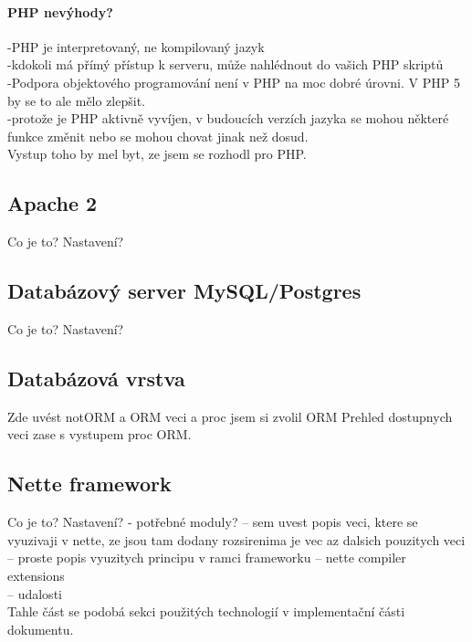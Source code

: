 \documentclass[11pt,oneside]{fithesis}
\begin{document}
       \paragraph{PHP nevýhody?}
       -PHP je interpretovaný, ne kompilovaný jazyk\\
-kdokoli má přímý přístup k serveru, může nahlédnout do vašich PHP skriptů\\
-Podpora objektového programování není v PHP na moc dobré úrovni. V PHP 5 by se to ale mělo zlepšit.\\
-protože je PHP aktivně vyvíjen, v budoucích verzích jazyka se mohou některé funkce změnit nebo se mohou chovat jinak než dosud. \\

                Vystup toho by mel byt, ze jsem se rozhodl pro PHP.

                \subsection{Apache 2}
                Co je to?
                Nastavení?

                \subsection{Databázový server MySQL/Postgres}
                Co je to?
                Nastavení?

                \subsection{Databázová vrstva}
                Zde uvést notORM a ORM veci a proc jsem si zvolil ORM
                Prehled dostupnych veci zase s vystupem proc ORM.

                \subsection{Nette framework}
                Co je to?
                Nastavení? - potřebné moduly?
                -- sem uvest popis veci, ktere se vyuzivaji v nette, ze jsou tam dodany rozsirenima je vec az dalsich pouzitych veci
                -- proste popis vyuzitych principu v ramci frameworku
                -- nette compiler extensions\\
                -- udalosti\\


                Tahle část se podobá sekci použitých technologií v implementační části dokumentu.
\end{document}
